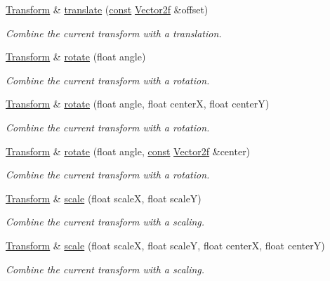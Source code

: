 \begin{DoxyCompactItemize}
\hyperlink{classsf_1_1_transform}{Transform} \& \hyperlink{classsf_1_1_transform_a452ff6e32d5120fa8c132c1bf0ad83cd}{translate} (\hyperlink{term__entry_8h_a57bd63ce7f9a353488880e3de6692d5a}{const} \hyperlink{namespacesf_a80cea3c46537294fd1d8d428566ad8b2}{Vector2f} \&offset)
\begin{DoxyCompactList}\small\item\em Combine the current transform with a translation. \end{DoxyCompactList}\item 
\hyperlink{classsf_1_1_transform}{Transform} \& \hyperlink{classsf_1_1_transform_a3e548c3c9e3fb9d4bd43cf852669e555}{rotate} (float angle)
\begin{DoxyCompactList}\small\item\em Combine the current transform with a rotation. \end{DoxyCompactList}\item 
\hyperlink{classsf_1_1_transform}{Transform} \& \hyperlink{classsf_1_1_transform_af0b7cc3fed36d0fa22d5d331a779eee2}{rotate} (float angle, float center\-X, float center\-Y)
\begin{DoxyCompactList}\small\item\em Combine the current transform with a rotation. \end{DoxyCompactList}\item 
\hyperlink{classsf_1_1_transform}{Transform} \& \hyperlink{classsf_1_1_transform_ad2a2520ad81724079d109d4a986f9902}{rotate} (float angle, \hyperlink{term__entry_8h_a57bd63ce7f9a353488880e3de6692d5a}{const} \hyperlink{namespacesf_a80cea3c46537294fd1d8d428566ad8b2}{Vector2f} \&center)
\begin{DoxyCompactList}\small\item\em Combine the current transform with a rotation. \end{DoxyCompactList}\item 
\hyperlink{classsf_1_1_transform}{Transform} \& \hyperlink{classsf_1_1_transform_a3f46af807f69d74120fb836334268671}{scale} (float scale\-X, float scale\-Y)
\begin{DoxyCompactList}\small\item\em Combine the current transform with a scaling. \end{DoxyCompactList}\item 
\hyperlink{classsf_1_1_transform}{Transform} \& \hyperlink{classsf_1_1_transform_a6eaeedd35e289cb17f9bf7f24dc28daa}{scale} (float scale\-X, float scale\-Y, float center\-X, float center\-Y)
\begin{DoxyCompactList}\small\item\em Combine the current transform with a scaling. \end{DoxyCompactList}\item 

\end{DoxyCompactItemize}
